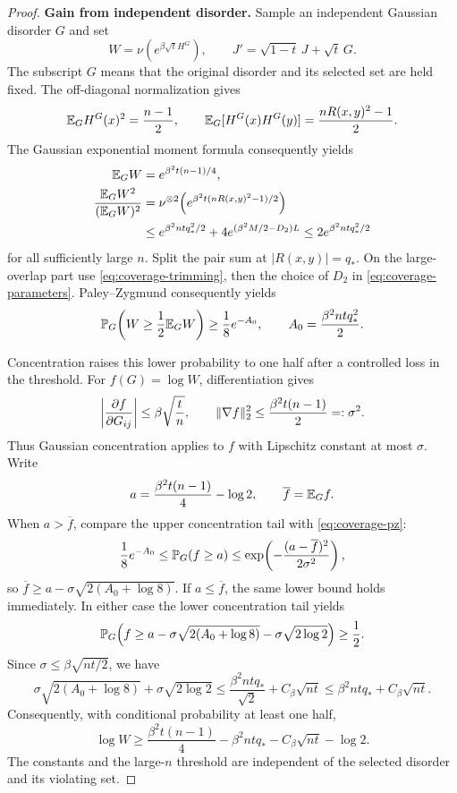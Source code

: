 \begin{proof}
\par\medskip\noindent\textbf{Gain from independent disorder.}\enspace
Sample an independent Gaussian disorder $G$ and set
\[
 W=\nu\!\left(e^{\beta\sqrt t H^G}\right),
 \qquad J'=\sqrt{1-t}\,J+\sqrt t\,G.
\]
The subscript $G$ means that the original disorder and its selected set
are held fixed. The off-diagonal normalization gives
\[
 \mathbb E_G H^G(x)^2=\frac{n-1}{2},
 \qquad
 \mathbb E_G[H^G(x)H^G(y)]=\frac{nR(x,y)^2-1}{2}.
\]
The Gaussian exponential moment formula consequently yields
\begin{align}
 \mathbb E_GW&=e^{\beta^2t(n-1)/4},\notag\\
 \frac{\mathbb E_GW^2}{(\mathbb E_GW)^2}
 &=\nu^{\otimes2}\!\left(
      e^{\beta^2t(nR(x,y)^2-1)/2}\right)\notag\\
 &\le e^{\beta^2ntq_*^2/2}
      +4e^{(\beta^2M/2-D_2)L}
 \le 2e^{\beta^2ntq_*^2/2}
 \label{eq:coverage-moments}
\end{align}
for all sufficiently large $n$.  Split the pair sum at $|R(x,y)|=q_*$. On the large-overlap part use
\eqref{eq:coverage-trimming}, then the choice of $D_2$ in
\eqref{eq:coverage-parameters}. Paley--Zygmund consequently yields
\begin{equation}
 \mathbb P_G\!\left(W\ge\frac12\mathbb E_GW\right)
 \ge\frac18e^{-A_0},
 \qquad A_0=\frac{\beta^2ntq_*^2}{2}.
 \label{eq:coverage-pz}
\end{equation}

Concentration raises this lower probability to one half after a controlled
loss in the threshold. For $f(G)=\log W$, differentiation gives
\[
 \left|\frac{\partial f}{\partial G_{ij}}\right|
 \le\beta\sqrt{\frac tn},
 \qquad
 \lVert \nabla f\rVert_2^2\le\frac{\beta^2t(n-1)}2=:\sigma^2.
\]
Thus Gaussian concentration applies to $f$ with Lipschitz constant
at most $\sigma$.  Write
\[
 a=\frac{\beta^2t(n-1)}4-\log2,
 \qquad \overline f=\mathbb E_Gf.
\]
When $a>\overline f$, compare the upper concentration tail with
\eqref{eq:coverage-pz}:
\[
 \frac18e^{-A_0}
 \le\mathbb P_G(f\ge a)
 \le\exp\!\left(-\frac{(a-\overline f)^2}{2\sigma^2}\right),
\]
so $\overline f\ge a-\sigma\sqrt{2(A_0+\log8)}$.
If $a\le\overline f$, the same lower bound holds immediately.
In either case the lower concentration tail yields
\[
 \mathbb P_G\!\left(
 f\ge a-\sigma\sqrt{2(A_0+\log8)}
            -\sigma\sqrt{2\log2}
 \right)\ge\frac12.
\]
Since $\sigma\le\beta\sqrt{nt/2}$, we have
\[
 \sigma\sqrt{2(A_0+\log8)}+\sigma\sqrt{2\log2}
 \le\frac{\beta^2ntq_*}{\sqrt2}+C_\beta\sqrt{nt}
 \le\beta^2ntq_*+C_\beta\sqrt{nt}.
\]
Consequently, with conditional probability at least one half,
\begin{equation}
 \log W\ge
 \frac{\beta^2t(n-1)}4-\beta^2ntq_*
                  -C_\beta\sqrt{nt}-\log2.
 \label{eq:coverage-logw}
\end{equation}
The constants and the large-$n$ threshold are independent of the selected
disorder and its violating set.


\end{proof}
